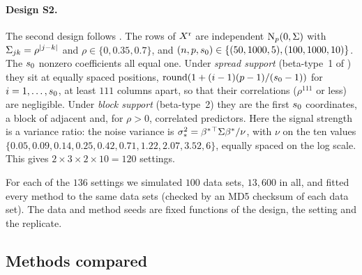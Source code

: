 \paragraph{Design S2.} The second design follows \citet[Sec.~3.1]{HastieTibshiraniTibshirani2020}. The rows of $X^{\mathrm r}$
are independent $\mathrm{N}_p(0,\Sigma)$ with $\Sigma_{jk}=\rho^{\lvert j-k\rvert}$ and $\rho\in\{0,0.35,0.7\}$, and
$(n,p,s_0)\in\{(50,1000,5),(100,1000,10)\}$. The $s_0$ nonzero coefficients all equal one. Under \emph{spread
support} (beta-type~1 of \citeauthor{HastieTibshiraniTibshirani2020}) they sit at equally spaced positions,
$\mathrm{round}(1+(i-1)(p-1)/(s_0-1))$ for $i=1,\dots,s_0$, at least $111$ columns apart, so that their correlations
($\rho^{111}$ or less) are negligible. Under \emph{block support} (beta-type~2) they are the first $s_0$ coordinates, a
block of adjacent and, for $\rho>0$, correlated predictors. Here the signal strength is a variance ratio: the noise
variance is $\sigma_*^2=\beta^*{}^\top\Sigma\beta^*/\nu$, with $\nu$ on the ten values
$\{0.05,0.09,0.14,0.25,0.42,0.71,1.22,2.07,3.52,6\}$, equally spaced on the log scale. This gives
$2\times3\times2\times10=120$ settings.

For each of the $136$ settings we simulated $100$ data sets, $13{,}600$ in all, and fitted every method to the same
data sets (checked by an MD5 checksum of each data set). The data and method seeds are fixed functions of the design,
the setting and the replicate.

\subsection{Methods compared}\label{sec:sims-methods}

